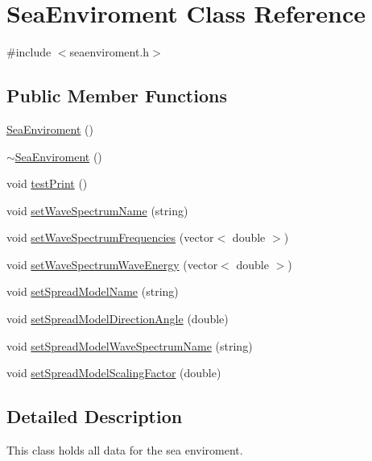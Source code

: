 \hypertarget{class_sea_enviroment}{\section{Sea\-Enviroment Class Reference}
\label{class_sea_enviroment}
}


{\ttfamily \#include $<$seaenviroment.\-h$>$}

\subsection*{Public Member Functions}
\begin{DoxyCompactItemize}
\item 
\hyperlink{class_sea_enviroment_af76135d3915bfc5e5ff526d5f61379b5}{Sea\-Enviroment} ()
\item 
\hyperlink{class_sea_enviroment_ae287606b637f6bf2bae1ab15b4bd6ead}{$\sim$\-Sea\-Enviroment} ()
\item 
void \hyperlink{class_sea_enviroment_a565628f92f230b23a144efba806db5d5}{test\-Print} ()
\item 
void \hyperlink{class_sea_enviroment_a8ec14b498399f23522f0b934b0dfee6d}{set\-Wave\-Spectrum\-Name} (string)
\item 
void \hyperlink{class_sea_enviroment_a61e0801c1942de481e1b9a0c38484792}{set\-Wave\-Spectrum\-Frequencies} (vector$<$ double $>$)
\item 
void \hyperlink{class_sea_enviroment_a6a0904d98840e33e78f67ac4a2d66636}{set\-Wave\-Spectrum\-Wave\-Energy} (vector$<$ double $>$)
\item 
void \hyperlink{class_sea_enviroment_a9ccfefa30c3f71dc0f72687435aa8e58}{set\-Spread\-Model\-Name} (string)
\item 
void \hyperlink{class_sea_enviroment_a85a797df8c4fe557b6ec9173434a0032}{set\-Spread\-Model\-Direction\-Angle} (double)
\item 
void \hyperlink{class_sea_enviroment_a7abfe63a9de261aa79ed90cf83347999}{set\-Spread\-Model\-Wave\-Spectrum\-Name} (string)
\item 
void \hyperlink{class_sea_enviroment_a8f2f360969e05ebcb478258ec4fd6077}{set\-Spread\-Model\-Scaling\-Factor} (double)
\end{DoxyCompactItemize}


\subsection{Detailed Description}
This class holds all data for the sea enviroment. 

